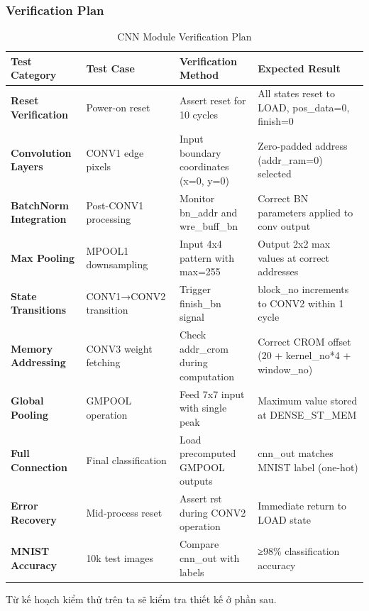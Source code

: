 \subsubsection{Verification Plan}
\begin{table}[H]
\centering
\caption{CNN Module Verification Plan}
\begin{tabular}{>{\bfseries}p{2.5cm}p{4cm}p{4cm}p{3cm}}
\toprule
\textbf{Test Category} & \textbf{Test Case} & \textbf{Verification Method} & \textbf{Expected Result} \\
\midrule

Reset Verification & Power-on reset & Assert reset for 10 cycles & All states reset to LOAD, pos\_data=0, finish=0 \\
\hline
Convolution Layers & CONV1 edge pixels & Input boundary coordinates (x=0, y=0) & Zero-padded address (addr\_ram=0) selected \\
\hline
BatchNorm Integration & Post-CONV1 processing & Monitor bn\_addr and wre\_buff\_bn & Correct BN parameters applied to conv output \\
\hline
Max Pooling & MPOOL1 downsampling & Input 4x4 pattern with max=255 & Output 2x2 max values at correct addresses \\
\hline
State Transitions & CONV1→CONV2 transition & Trigger finish\_bn signal & block\_no increments to CONV2 within 1 cycle \\
\hline
Memory Addressing & CONV3 weight fetching & Check addr\_crom during computation & Correct CROM offset (20 + kernel\_no*4 + window\_no) \\
\hline
Global Pooling & GMPOOL operation & Feed 7x7 input with single peak & Maximum value stored at DENSE\_ST\_MEM \\
\hline
Full Connection & Final classification & Load precomputed GMPOOL outputs & cnn\_out matches MNIST label (one-hot) \\
\hline
Error Recovery & Mid-process reset & Assert rst during CONV2 operation & Immediate return to LOAD state \\
\hline
MNIST Accuracy & 10k test images & Compare cnn\_out with labels & ≥98\% classification accuracy \\

\bottomrule
\end{tabular}
\end{table}
Từ kế hoạch kiểm thử trên ta sẽ kiểm tra thiết kế ở phần sau.